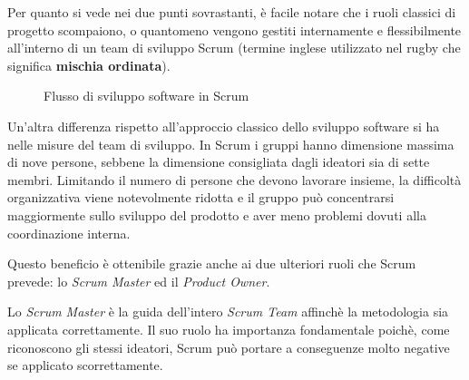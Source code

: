 Per quanto si vede nei due punti sovrastanti, è facile notare che i ruoli
classici di progetto scompaiono, o quantomeno vengono gestiti internamente e
flessibilmente all'interno di un team di sviluppo Scrum (termine inglese
utilizzato nel rugby che significa \textbf{mischia ordinata}).

\begin{figure}[H]%
  \noindent{}%
  \caption{Flusso di sviluppo software in Scrum}%
  \label{fig:scrum-schema}%
\end{figure}%

Un'altra differenza rispetto all'approccio classico dello sviluppo software si
ha nelle misure del team di sviluppo. In Scrum i gruppi hanno dimensione
massima di nove persone, sebbene la dimensione consigliata dagli ideatori sia
di sette membri. Limitando il numero di persone che devono lavorare insieme, la
difficoltà organizzativa viene notevolmente ridotta e il gruppo può
concentrarsi maggiormente sullo sviluppo del prodotto e aver meno problemi
dovuti alla coordinazione interna.

Questo beneficio è ottenibile grazie anche ai due ulteriori ruoli che Scrum
prevede: lo \emph{Scrum Master} ed il \emph{Product Owner}.

Lo \emph{Scrum Master} è la guida dell'intero \emph{Scrum Team} affinchè la
metodologia sia applicata correttamente. Il suo ruolo ha importanza
fondamentale poichè, come riconoscono gli stessi ideatori, Scrum può portare a
conseguenze molto negative se applicato scorrettamente.

